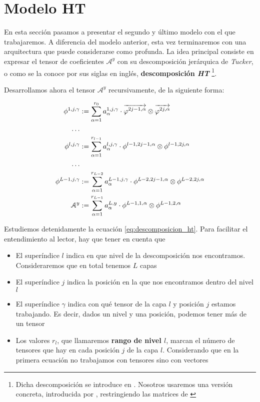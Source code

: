 \section{Modelo HT} \label{sec:modelo_ht}

En esta sección pasamos a presentar el segundo y último modelo con el que trabajaremos. A diferencia del modelo anterior, esta vez terminaremos con una arquitectura que puede considerarse como profunda. La idea principal consiste en expresar el tensor de coeficientes $\mathcal{A}^y$ con su descomposición jerárquica de \textit{Tucker}, o como se la conoce por sus siglas en inglés, \textbf{descomposición \textit{HT}} \footnote{Dicha descomposición se introduce en \cite{matematicas:descomposicion_ht}. Nosotros usaremos una versión concreta, introducida por \cite{matematicas:principal}, restringiendo las matrices de \cite{matematicas:descomposicion_ht}}.

Desarrollamos ahora el tensor $\mathcal{A}^y$ recursivamente, de la siguiente forma:

\begin{equation} \label{eq:descomposicion_ht}
\begin{split}
    \phi^{1, j, \gamma} &:= \sum_{\alpha = 1}^{r_0} a_{\alpha}^{1, j, \gamma} \cdot \overrightarrow{\varphi^{2j-1, \alpha}} \otimes \overrightarrow{\varphi^{2j, \alpha}} \\
    \ldots \\
    \phi^{l, j, \gamma} &:= \sum_{\alpha = 1}^{r_{l-1}} a_{\alpha}^{l, j, \gamma} \cdot \phi^{l-1, 2j-1, \alpha} \otimes \phi^{l-1, 2j, \alpha} \\
    \ldots \\
    \phi^{L - 1, j, \gamma} &:= \sum_{\alpha = 1}^{r_{L-2}} a_{\alpha}^{L - 1, j, \gamma} \cdot \phi^{L-2, 2j-1, \alpha} \otimes \phi^{L-2, 2j, \alpha} \\
    \mathcal{A}^y &:= \sum_{\alpha = 1}^{r_{L-1}} a_{\alpha}^{L, y} \cdot \phi^{L-1, 1, \alpha} \otimes \phi^{L-1, 2, \alpha}
\end{split}
\end{equation}

Estudiemos detenidamente la ecuación \eqref{eq:descomposicion_ht}. Para facilitar el entendimiento al lector, hay que tener en cuenta que

\begin{itemize}
    \item El superíndice $l$ indica en que nivel de la descomposición nos encontramos. Consideraremos que en total tenemos $L$ capas
    \item El superíndice $j$ indica la posición en la que nos encontramos dentro del nivel $l$
    \item El superíndice $\gamma$ indica con qué tensor de la capa $l$ y posición $j$ estamos trabajando. Es decir, dados un nivel y una posición, podemos tener más de un tensor
    \item Los valores $r_l$, que llamaremos \textbf{rango de nivel $l$}, marcan el número de tensores que hay en cada posición $j$ de la capa $l$. Considerando que en la primera ecuación no trabajamos con tensores sino con vectores
\end{itemize}

